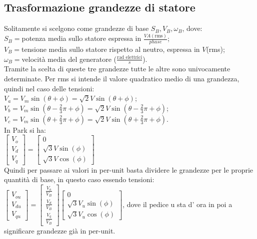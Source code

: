 \documentclass[Lau,noexaminfo]{sapthesis}
\begin{document}
	 \subsection{Trasformazione grandezze di statore}
	 Solitamente si scelgono come grandezze di base $S_B,V_B,\omega_B$, dove:\\
	 $S_B=$potenza media sullo statore espressa in $\frac{VA(\text{rms})}{phase}$;\\
	 $V_B=$tensione media sullo statore rispetto al neutro, espressa in $V$(rms);\\
	 $\omega_B=$velocità media del generatore ($\frac{\text{rad elettrici}}{s}$).\\
	 Tramite la scelta di queste tre grandezze tutte le altre sono univocamente determinate. Per rms si intende il valore quadratico medio di una grandezza, quindi nel caso delle tensioni:\\
	 $V_a=V_m\sin(\theta+\phi)=\sqrt{2}V\sin(\theta+\phi)$;\\
	 $V_b=V_m\sin(\theta-\frac{2}{3}\pi+\phi)=\sqrt{2}V\sin(\theta-\frac{2}{3}\pi+\phi)$;\\
	 $V_c=V_m\sin(\theta+\frac{2}{3}\pi+\phi)=\sqrt{2}V\sin(\theta+\frac{2}{3}\pi+\phi)$.\\
	 In Park si ha:\\
	 $\begin{bmatrix}
	 V_o\\
	 V_d\\
	 V_q
	 \end{bmatrix}=
	 \begin{bmatrix}
	 0\\
	 \sqrt{3}V\sin(\phi)\\
	 \sqrt{3}V\cos(\phi)
	 \end{bmatrix}$\\
	 Quindi per passare ai valori in per-unit basta dividere le grandezze per le proprie quantità di base, in questo caso essendo tensioni:\\
	 $\begin{bmatrix}
	 V_{ou}\\
	 V_{du}\\
	 V_{qu}
	 \end{bmatrix}=
	 \begin{bmatrix}
	 \frac{V_{o}}{V_B}\\
	 \frac{V_{d}}{V_B}\\
	 \frac{V_{q}}{V_B}
	 \end{bmatrix}
	 \begin{bmatrix}
	 0\\
	 \sqrt{3}V_u\sin(\phi)\\
	 \sqrt{3}V_u\cos(\phi)
	 \end{bmatrix}$, dove il pedice u sta d' ora in poi a significare grandezze già in per-unit.\\
\end{document}

